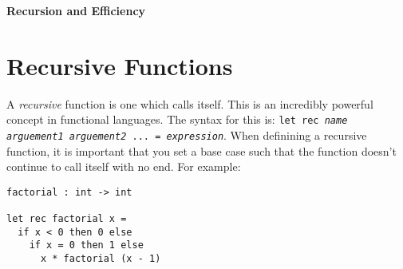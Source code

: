 \documentclass[12pt]{article}
\begin{document}
\begin{center}\LARGE\bf
    Recursion and Efficiency
\end{center}

\section{Recursive Functions}
A \textit{recursive} function is one which calls itself. This is an incredibly powerful concept in
functional languages. The syntax for this is: \texttt{let rec \textit{name arguement1 arguement2} ... = \textit{expression}}.
When definining a recursive function, it is important that you set a base case such that the function
doesn't continue to call itself with no end. For example:
\begin{lstlisting}
factorial : int -> int

let rec factorial x =
  if x < 0 then 0 else
    if x = 0 then 1 else
      x * factorial (x - 1)
\end{lstlisting}
\end{document}
